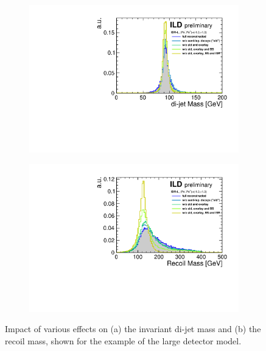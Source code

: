 \begin{figure}[htbp]
\begin{subfigure}{0.49\hsize} 
 \includegraphics[width=\textwidth]{Performance/fig/compare_cheat_mjj_l5_lr.pdf}
 \caption{ \label{fig:Hinv:cheat:mjj}}
 \end{subfigure}
\begin{subfigure}{0.49\hsize} 
\includegraphics[width=\textwidth]{Performance/fig/compare_cheat_mrec_l5_lr.pdf}
 \caption{  \label{fig:Hinv:cheat:mrec}}
 \end{subfigure}
\caption{Impact of various effects on
(a) the invariant di-jet mass and
(b) the recoil mass,
shown for the example of the large detector model.
}
\label{fig:Hinv:cheat}
\end{figure}

